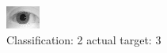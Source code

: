 \begin{figure}[h!]
\begin{center}
\includegraphics[width=0.60\columnwidth]{figures/ID1073_class_2_target_3.png}
\end{center}
\caption{ Classification: 2 actual target: 3}
\label{fig:ID1073_class_2_target_3}
\end{figure}
